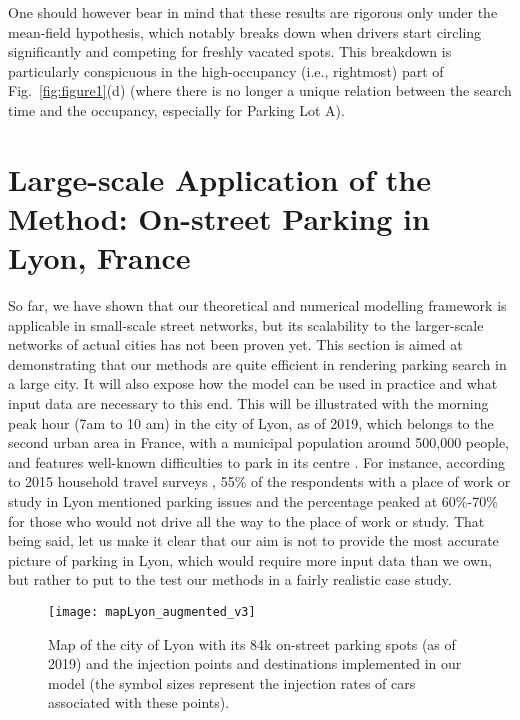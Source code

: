 \documentclass[trsc,reprint]{informs3}
\newcommand{\AN}[1]{#1}
\begin{document}
One should however bear in mind that these results are rigorous only under the mean-field hypothesis, which notably
breaks down when drivers start circling significantly and competing for freshly vacated spots. This breakdown is particularly conspicuous in the high-occupancy (i.e., rightmost) part of Fig.~\ref{fig:figure1}(d) (where there is no longer a unique relation between the search time and the occupancy, especially for Parking Lot A).





\section{Large-scale Application of the Method: On-street Parking in Lyon, France \label{sec:Lyon}}

So far, we have shown that our theoretical and numerical modelling framework is
applicable in small-scale street networks, but its scalability to
the larger-scale networks of actual cities has not been proven yet. This section is aimed at demonstrating that
our methods are quite efficient in rendering parking search in a large city. It will \AN{also expose} how the model can be
used in practice and what input data are necessary to this end.
This will be illustrated with the morning peak hour (7am to 10 am) in the city of Lyon, as of 2019, which belongs to the second
urban area in France, with a municipal population around 500,000 people, and features
well-known difficulties to park in its centre \citep{SARECO2005}. For instance, according to 2015 household travel surveys \citep{Cerema2015EMD}, 55\% of the respondents with a place of work or study in Lyon mentioned parking issues and the percentage peaked at 60\%-70\% for those who would not drive all the way to the place of work or study. That being said, let us make it clear that our aim is not to provide the most accurate picture of parking in Lyon, which would require more input data than we own,
but rather to put to the test our methods in a fairly realistic case study. 



\begin{figure}[!ht]
    \centering
   \texttt{[image: mapLyon\_augmented\_v3]}
        \caption{Map of the city of Lyon with its 84k on-street parking spots (as of 2019) and
        the injection points and destinations implemented in our model (the symbol sizes
        represent the injection rates of cars associated with these points). }
        \label{fig:mapLyon}
\end{figure}
\end{document}
